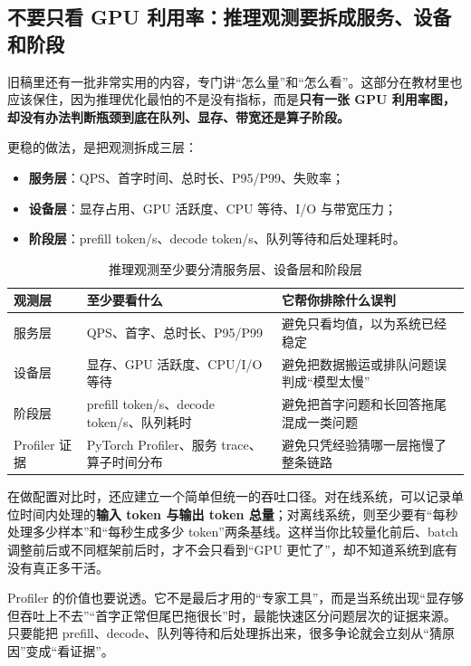 \subsection{不要只看 GPU 利用率：推理观测要拆成服务、设备和阶段}
旧稿里还有一批非常实用的内容，专门讲“怎么量”和“怎么看”。这部分在教材里也应该保住，因为推理优化最怕的不是没有指标，而是\textbf{只有一张 GPU 利用率图，却没有办法判断瓶颈到底在队列、显存、带宽还是算子阶段。}

更稳的做法，是把观测拆成三层：
\begin{itemize}
  \item \textbf{服务层}：QPS、首字时间、总时长、P95/P99、失败率；
  \item \textbf{设备层}：显存占用、GPU 活跃度、CPU 等待、I/O 与带宽压力；
  \item \textbf{阶段层}：prefill token/s、decode token/s、队列等待和后处理耗时。
\end{itemize}

\begin{table}[H]
\centering
\small
\begin{tabularx}{\textwidth}{>{\raggedright\arraybackslash}p{2.8cm}>{\raggedright\arraybackslash}p{3.2cm}>{\raggedright\arraybackslash}X}
\toprule
\textbf{观测层} & \textbf{至少要看什么} & \textbf{它帮你排除什么误判} \\
\midrule
服务层 & QPS、首字、总时长、P95/P99 & 避免只看均值，以为系统已经稳定 \\
设备层 & 显存、GPU 活跃度、CPU/I/O 等待 & 避免把数据搬运或排队问题误判成“模型太慢” \\
阶段层 & prefill token/s、decode token/s、队列耗时 & 避免把首字问题和长回答拖尾混成一类问题 \\
Profiler 证据 & PyTorch Profiler、服务 trace、算子时间分布 & 避免只凭经验猜哪一层拖慢了整条链路 \\
\bottomrule
\end{tabularx}
\caption{推理观测至少要分清服务层、设备层和阶段层}
\label{tab:inference-observability}
\end{table}

在做配置对比时，还应建立一个简单但统一的吞吐口径。对在线系统，可以记录单位时间内处理的\textbf{输入 token 与输出 token 总量}；对离线系统，则至少要有“每秒处理多少样本”和“每秒生成多少 token”两条基线。这样当你比较量化前后、batch 调整前后或不同框架前后时，才不会只看到“GPU 更忙了”，却不知道系统到底有没有真正多干活。

Profiler 的价值也要说透。它不是最后才用的“专家工具”，而是当系统出现“显存够但吞吐上不去”“首字正常但尾巴拖很长”时，最能快速区分问题层次的证据来源。只要能把 prefill、decode、队列等待和后处理拆出来，很多争论就会立刻从“猜原因”变成“看证据”。

